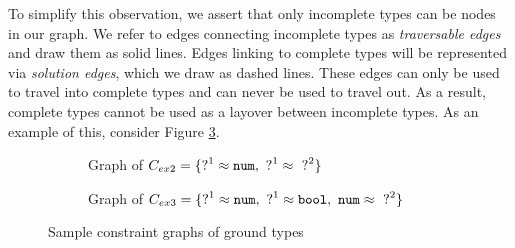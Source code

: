 To simplify this observation, we assert that only incomplete types can be nodes in our graph. We refer to edges connecting incomplete types as \emph{traversable edges} and draw them as solid lines. Edges linking to complete types will be represented via \emph{solution edges}, which we draw as dashed lines. These edges can only be used to travel into complete types and can never be used to travel out. As a result, complete types cannot be used as a layover between incomplete types. As an example of this, consider Figure \ref{fig:ex2ex3graphs}. 
\begin{figure}[htb!]
\centering
\begin{subfigure}{.49\textwidth}
  \centering
  \caption{Graph of $C_{ex2} = \{ \mathtt{?}^{1} \approx \mathtt{num}, ~ \mathtt{?}^{1} \approx~ \mathtt{?}^{2}\}$}
  \label{fig:reachable-tag}
\end{subfigure}
\begin{subfigure}{.49\textwidth}
  \centering
  \caption{Graph of $C_{ex3} = \{ \mathtt{?}^1 \approx \mathtt{num}, ~ \mathtt{?}^1 \approx \mathtt{bool}, ~ \mathtt{num} \approx~ \mathtt{?}^2\}$}
  \label{fig:disjoint-nodes}
\end{subfigure}
\caption{Sample constraint graphs of ground types}
\label{fig:ex2ex3graphs}
\end{figure}

